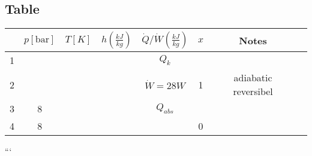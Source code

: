 \subsection*{Table}

\begin{tabular}{|c|c|c|c|c|c|c|c|}
    \hline
    & $p[\text{bar}]$ & $T[K]$ & $h\left(\frac{kJ}{kg}\right)$ & $\dot{Q}/\dot{W}\left(\frac{kJ}{kg}\right)$ & $x$ & Notes \\
    \hline
    1 & & & & $Q_k$ & & \\
    \hline
    2 & & & & $\dot{W} = 28W$ & 1 & adiabatic reversibel \\
    \hline
    3 & 8 & & & $Q_{abs}$ & & \\
    \hline
    4 & 8 & & & & 0 & \\
    \hline
\end{tabular}

```